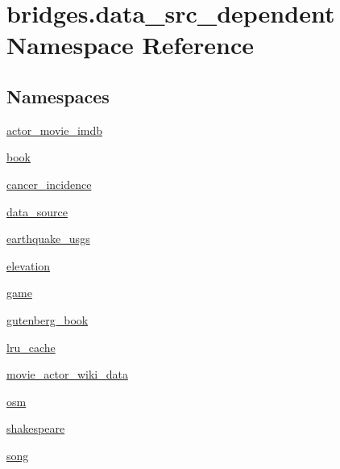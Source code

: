 \hypertarget{namespacebridges_1_1data__src__dependent}{}\section{bridges.\+data\+\_\+src\+\_\+dependent Namespace Reference}
\label{namespacebridges_1_1data__src__dependent}
\subsection*{Namespaces}
\begin{DoxyCompactItemize}
\item 
 \mbox{\hyperlink{namespacebridges_1_1data__src__dependent_1_1actor__movie__imdb}{actor\+\_\+movie\+\_\+imdb}}
\item 
 \mbox{\hyperlink{namespacebridges_1_1data__src__dependent_1_1book}{book}}
\item 
 \mbox{\hyperlink{namespacebridges_1_1data__src__dependent_1_1cancer__incidence}{cancer\+\_\+incidence}}
\item 
 \mbox{\hyperlink{namespacebridges_1_1data__src__dependent_1_1data__source}{data\+\_\+source}}
\item 
 \mbox{\hyperlink{namespacebridges_1_1data__src__dependent_1_1earthquake__usgs}{earthquake\+\_\+usgs}}
\item 
 \mbox{\hyperlink{namespacebridges_1_1data__src__dependent_1_1elevation}{elevation}}
\item 
 \mbox{\hyperlink{namespacebridges_1_1data__src__dependent_1_1game}{game}}
\item 
 \mbox{\hyperlink{namespacebridges_1_1data__src__dependent_1_1gutenberg__book}{gutenberg\+\_\+book}}
\item 
 \mbox{\hyperlink{namespacebridges_1_1data__src__dependent_1_1lru__cache}{lru\+\_\+cache}}
\item 
 \mbox{\hyperlink{namespacebridges_1_1data__src__dependent_1_1movie__actor__wiki__data}{movie\+\_\+actor\+\_\+wiki\+\_\+data}}
\item 
 \mbox{\hyperlink{namespacebridges_1_1data__src__dependent_1_1osm}{osm}}
\item 
 \mbox{\hyperlink{namespacebridges_1_1data__src__dependent_1_1shakespeare}{shakespeare}}
\item 
 \mbox{\hyperlink{namespacebridges_1_1data__src__dependent_1_1song}{song}}
\end{DoxyCompactItemize}
